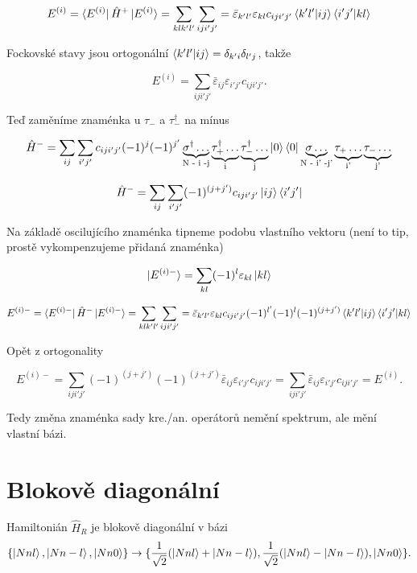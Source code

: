 \documentclass{article}
\begin{document}
    $$E^{(i)} = \bra{E^{(i)}} \hat{H}^+ \ket{E^{(i)}} = \sum_{klk'l'}\sum_{iji'j'} = 
    \bar{\varepsilon}_{k'l'}\varepsilon_{kl} c_{iji'j'} \braket{k'l'|ij}\braket{i'j'|kl}$$

    Fockovské stavy jsou ortogonální $\braket{k'l'|ij} = \delta_{k'i}\delta_{l'j}$, takže 

    $$E^{(i)} =\sum_{iji'j'}
    \bar{\varepsilon}_{ij}\varepsilon_{i'j'} c_{iji'j'}.$$

    Teď zaměníme znaménka u $\tau_-$ a $\tau_-^{\dagger}$ na mínus

    $$\hat{H}^- = 
     \sum_{i j} \sum_{i' j'} c_{iji'j'} (-1)^{j}(-1)^{j'} \underbrace{\sigma^{\dagger} \dots}_\text{N - i -j}
    \underbrace{\tau^{\dagger}_+ \dots}_\text{i}
    \underbrace{\tau^{\dagger}_- \dots}_\text{j} 
    \ket{0}\bra{0} \underbrace{\sigma\dots}_\text{N - i' -j'}
    \underbrace{\tau_+ \dots}_\text{i'}
    \underbrace{\tau_- \dots}_\text{j'}$$

    $$\hat{H}^- = 
    \sum_{i j} \sum_{i' j'}  (-1)^{(j + j')} c_{iji'j'} \ket{ij}\bra{i'j'}$$

    Na základě oscilujícího znaménka tipneme podobu vlastního vektoru (není to tip, prostě vykompenzujeme přidaná znaménka)
    
    $$\ket{E^{(i)-}} = \sum_{kl} (-1)^l \varepsilon_{kl} \ket{kl}$$

    $$E^{(i)-} = \bra{E^{(i)-}} \hat{H}^- \ket{E^{(i)-}} = \sum_{klk'l'}\sum_{iji'j'} = 
    \bar{\varepsilon}_{k'l'}\varepsilon_{kl} c_{iji'j'} (-1)^{l'} (-1)^l (-1)^{(j + j')} \braket{k'l'|ij}\braket{i'j'|kl}$$
    
    Opět z ortogonality 

    $$E^{(i)-} = \sum_{iji'j'} (-1)^{(j + j')}(-1)^{(j + j')}
    \bar{\varepsilon}_{ij}\varepsilon_{i'j'} c_{iji'j'} = \sum_{iji'j'}
    \bar{\varepsilon}_{ij}\varepsilon_{i'j'} c_{iji'j'} = E^{(i)}. $$

    Tedy změna znaménka sady kre./an. operátorů nemění spektrum, ale mění vlastní bázi.

    \section{Blokově diagonální}


    Hamiltonián $\hat{H}_R$ je blokově diagonální v bázi 
    $$\{\ket{Nnl},\ket{Nn-l},\ket{Nn0}\} \rightarrow \{\frac{1}{\sqrt{2}}(\ket{Nnl} + \ket{Nn-l}),\frac{1}{\sqrt{2}}(\ket{Nnl} - \ket{Nn-l}),\ket{Nn0}\}.$$
    
\end{document}
